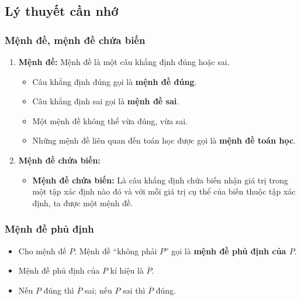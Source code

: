 \subsection{Lý thuyết cần nhớ}

\subsubsection{Mệnh đề, mệnh đề chứa biến}
\begin{kienthuc}
\begin{enumerate}
	\item \textbf{Mệnh đề:} Mệnh đề là một câu khẳng định đúng hoặc sai.
	\begin{itemize}
	\item Câu khẳng định đúng gọi là \textbf{mệnh đề đúng}.
	
	\item Câu khẳng định sai gọi là \textbf{mệnh đề sai}.
	
	\item Một mệnh đề không thể vừa đúng, vừa sai.
	
	\item Những mệnh đề liên quan đến toán học được gọi là \textbf{mệnh đề toán học}.
	\end{itemize}
\item \textbf{Mệnh đề chứa biến:}
\begin{itemize}
	\item \textbf{Mệnh đề chứa biến:} Là câu khẳng định chứa biến nhận giá trị trong một tập xác định nào đó và với mỗi giá trị cụ thể của biến thuộc tập xác định, ta được một mệnh đề.
\end{itemize}
\end{enumerate}
\end{kienthuc}

\subsubsection{Mệnh đề phủ định}


\begin{kienthuc}
\begin{itemize}
	\item Cho mệnh đề $P$. Mệnh đề ``không phải $P$'' gọi là \textbf{mệnh đề phủ định của $P$}.
	
	\item Mệnh đề phủ định của $P$ kí hiệu là $\overline{P}$.
	
	\item Nếu $P$ đúng thì $\overline{P}$ sai; nếu $P$ sai thì $\overline{P}$ đúng.
\end{itemize}
\end{kienthuc}

